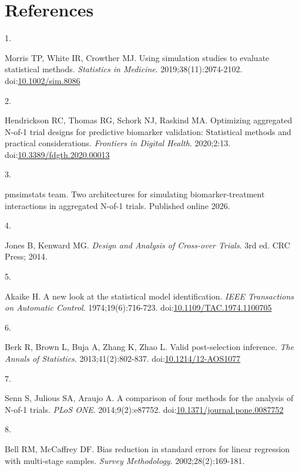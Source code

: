 \documentclass[
  11pt,
]{article}
\newlength{\cslhangindent}
\newlength{\csllabelwidth}
\newenvironment{CSLReferences}[2] %
 {\begin{list}{}{%
  \setlength{\itemindent}{0pt}
  \setlength{\leftmargin}{0pt}
  \setlength{\parsep}{0pt}
  \ifodd #1
   \setlength{\leftmargin}{\cslhangindent}
   \setlength{\itemindent}{-1\cslhangindent}
  \fi
  \setlength{\itemsep}{#2\baselineskip}}}
 {\end{list}}
\newcommand{\CSLLeftMargin}[1]{\parbox[t]{\csllabelwidth}{\strut#1\strut}}
\newcommand{\CSLRightInline}[1]{\parbox[t]{\linewidth - \csllabelwidth}{\strut#1\strut}}
\begin{document}
\section{References}\label{references}

\protect{}\label{refs}
\begin{CSLReferences}{0}{1}
\CSLLeftMargin{1. }%
\CSLRightInline{Morris TP, White IR, Crowther MJ. Using simulation studies to evaluate statistical methods. \emph{Statistics in Medicine}. 2019;38(11):2074-2102. doi:\href{https://doi.org/10.1002/sim.8086}{10.1002/sim.8086}}

\CSLLeftMargin{2. }%
\CSLRightInline{Hendrickson RC, Thomas RG, Schork NJ, Raskind MA. Optimizing aggregated {N}-of-1 trial designs for predictive biomarker validation: Statistical methods and practical considerations. \emph{Frontiers in Digital Health}. 2020;2:13. doi:\href{https://doi.org/10.3389/fdgth.2020.00013}{10.3389/fdgth.2020.00013}}

\CSLLeftMargin{3. }%
\CSLRightInline{{pmsimstats team}. Two architectures for simulating biomarker-treatment interactions in aggregated {N}-of-1 trials. Published online 2026.}

\CSLLeftMargin{4. }%
\CSLRightInline{Jones B, Kenward MG. \emph{Design and Analysis of Cross-over Trials}. 3rd ed. CRC Press; 2014.}

\CSLLeftMargin{5. }%
\CSLRightInline{Akaike H. A new look at the statistical model identification. \emph{IEEE Transactions on Automatic Control}. 1974;19(6):716-723. doi:\href{https://doi.org/10.1109/TAC.1974.1100705}{10.1109/TAC.1974.1100705}}

\CSLLeftMargin{6. }%
\CSLRightInline{Berk R, Brown L, Buja A, Zhang K, Zhao L. Valid post-selection inference. \emph{The Annals of Statistics}. 2013;41(2):802-837. doi:\href{https://doi.org/10.1214/12-AOS1077}{10.1214/12-AOS1077}}

\CSLLeftMargin{7. }%
\CSLRightInline{Senn S, Julious SA, Araujo A. A comparison of four methods for the analysis of {N}-of-1 trials. \emph{PLoS ONE}. 2014;9(2):e87752. doi:\href{https://doi.org/10.1371/journal.pone.0087752}{10.1371/journal.pone.0087752}}

\CSLLeftMargin{8. }%
\CSLRightInline{Bell RM, McCaffrey DF. Bias reduction in standard errors for linear regression with multi-stage samples. \emph{Survey Methodology}. 2002;28(2):169-181.}


\end{CSLReferences}
\end{document}
